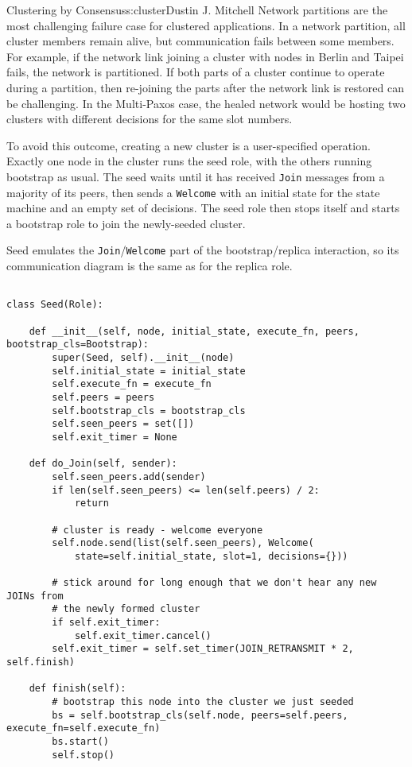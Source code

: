 \begin{aosachapter}{Clustering by Consensus}{s:cluster}{Dustin J. Mitchell}
Network partitions are the most challenging failure case for clustered
applications. In a network partition, all cluster members remain alive,
but communication fails between some members. For example, if the
network link joining a cluster with nodes in Berlin and Taipei fails,
the network is partitioned. If both parts of a cluster continue to
operate during a partition, then re-joining the parts after the network
link is restored can be challenging. In the Multi-Paxos case, the healed
network would be hosting two clusters with different decisions for the
same slot numbers.

To avoid this outcome, creating a new cluster is a user-specified
operation. Exactly one node in the cluster runs the seed role, with the
others running bootstrap as usual. The seed waits until it has received
\texttt{Join} messages from a majority of its peers, then sends a
\texttt{Welcome} with an initial state for the state machine and an
empty set of decisions. The seed role then stops itself and starts a
bootstrap role to join the newly-seeded cluster.

Seed emulates the \texttt{Join}/\texttt{Welcome} part of the
bootstrap/replica interaction, so its communication diagram is the same
as for the replica role.

\begin{verbatim}

class Seed(Role):

    def __init__(self, node, initial_state, execute_fn, peers, bootstrap_cls=Bootstrap):
        super(Seed, self).__init__(node)
        self.initial_state = initial_state
        self.execute_fn = execute_fn
        self.peers = peers
        self.bootstrap_cls = bootstrap_cls
        self.seen_peers = set([])
        self.exit_timer = None

    def do_Join(self, sender):
        self.seen_peers.add(sender)
        if len(self.seen_peers) <= len(self.peers) / 2:
            return

        # cluster is ready - welcome everyone
        self.node.send(list(self.seen_peers), Welcome(
            state=self.initial_state, slot=1, decisions={}))

        # stick around for long enough that we don't hear any new JOINs from
        # the newly formed cluster
        if self.exit_timer:
            self.exit_timer.cancel()
        self.exit_timer = self.set_timer(JOIN_RETRANSMIT * 2, self.finish)

    def finish(self):
        # bootstrap this node into the cluster we just seeded
        bs = self.bootstrap_cls(self.node, peers=self.peers, execute_fn=self.execute_fn)
        bs.start()
        self.stop()
    

\end{verbatim}
\end{aosachapter}
